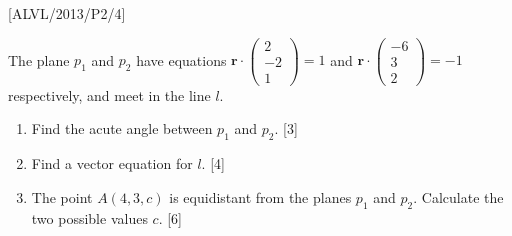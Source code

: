\item {[}ALVL/2013/P2/4{]}

The plane $p_{1}$ and $p_{2}$ have equations $\mathbf{r}\cdot\left(\begin{array}{c}
2\\
-2\\
1
\end{array}\right)=1$ and $\mathbf{r}\cdot\left(\begin{array}{c}
-6\\
3\\
2
\end{array}\right)=-1$ respectively, and meet in the line $l$. 
\begin{enumerate}
\item Find the acute angle between $p_{1}$ and $p_{2}$. \hfill{} {[}3{]}
\item Find a vector equation for $l$. \hfill{}{[}4{]}
\item The point $A\left(4,3,c\right)$ is equidistant from the planes $p_{1}$
and $p_{2}$. Calculate the two possible values $c$. \hfill{} {[}6{]}
\end{enumerate}

